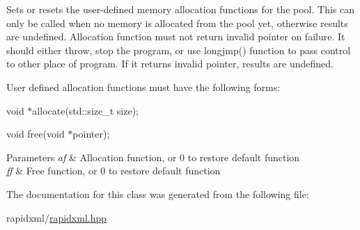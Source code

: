 Sets or resets the user-\/defined memory allocation functions for the pool. This can only be called when no memory is allocated from the pool yet, otherwise results are undefined. Allocation function must not return invalid pointer on failure. It should either throw, stop the program, or use {\ttfamily longjmp()} function to pass control to other place of program. If it returns invalid pointer, results are undefined. \par
\par
 User defined allocation functions must have the following forms\-: \par
{\ttfamily  \par
void $\ast$allocate(std\-::size\-\_\-t size); \par
void free(void $\ast$pointer); }\par
 
\begin{DoxyParams}{Parameters}
{\em af} & Allocation function, or 0 to restore default function \\
\hline
{\em ff} & Free function, or 0 to restore default function \\
\hline
\end{DoxyParams}


The documentation for this class was generated from the following file\-:\begin{DoxyCompactItemize}
\item 
rapidxml/\hyperlink{rapidxml_8hpp}{rapidxml.\-hpp}\end{DoxyCompactItemize}
